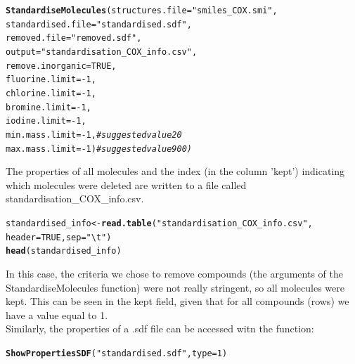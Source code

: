 \documentclass[twoside,a4wide,12pt]{article}\usepackage[]{graphicx}\usepackage[]{color}
\makeatletter
\newcommand{\hlnum}[1]{\textcolor[rgb]{0.686,0.059,0.569}{#1}}%
\newcommand{\hlstr}[1]{\textcolor[rgb]{0.192,0.494,0.8}{#1}}%
\newcommand{\hlcom}[1]{\textcolor[rgb]{0.678,0.584,0.686}{\textit{#1}}}%
\newcommand{\hlopt}[1]{\textcolor[rgb]{0,0,0}{#1}}%
\newcommand{\hlstd}[1]{\textcolor[rgb]{0.345,0.345,0.345}{#1}}%
\newcommand{\hlkwb}[1]{\textcolor[rgb]{0.69,0.353,0.396}{#1}}%
\newcommand{\hlkwc}[1]{\textcolor[rgb]{0.333,0.667,0.333}{#1}}%
\newcommand{\hlkwd}[1]{\textcolor[rgb]{0.737,0.353,0.396}{\textbf{#1}}}%
\newenvironment{kframe}{%
 \def\at@end@of@kframe{}%
 \ifinner\ifhmode%
  \def\at@end@of@kframe{\end{minipage}}%
  \begin{minipage}{\columnwidth}%
 \fi\fi%
 \def\FrameCommand##1{\hskip\@totalleftmargin \hskip-\fboxsep
 \colorbox{shadecolor}{##1}\hskip-\fboxsep
     \hskip-\linewidth \hskip-\@totalleftmargin \hskip\columnwidth}%
 \MakeFramed {\advance\hsize-\width
   \@totalleftmargin\z@ \linewidth\hsize
   \@setminipage}}%
 {\par\unskip\endMakeFramed%
 \at@end@of@kframe}
\newenvironment{knitrout}{}{} %
\makeatother
\begin{document}
\begin{knitrout}
\color{fgcolor}\begin{kframe}
\begin{alltt}
\hlkwd{StandardiseMolecules}\hlstd{(}\hlkwc{structures.file}\hlstd{=}\hlstr{"smiles_COX.smi"}\hlstd{,}
\hlkwc{standardised.file}\hlstd{=}\hlstr{"standardised.sdf"}\hlstd{,}
\hlkwc{removed.file}\hlstd{=}\hlstr{"removed.sdf"}\hlstd{,}
\hlkwc{output}\hlstd{=}\hlstr{"standardisation_COX_info.csv"}\hlstd{,}
\hlkwc{remove.inorganic}\hlstd{=}\hlnum{TRUE}\hlstd{,}
\hlkwc{fluorine.limit}\hlstd{=}\hlopt{-}\hlnum{1}\hlstd{,}
\hlkwc{chlorine.limit}\hlstd{=}\hlopt{-}\hlnum{1}\hlstd{,}
\hlkwc{bromine.limit}\hlstd{=}\hlopt{-}\hlnum{1}\hlstd{,}
\hlkwc{iodine.limit}\hlstd{=}\hlopt{-}\hlnum{1}\hlstd{,}
\hlkwc{min.mass.limit}\hlstd{=}\hlopt{-}\hlnum{1}\hlstd{,} \hlcom{#suggested value 20}
\hlkwc{max.mass.limit}\hlstd{=}\hlopt{-}\hlnum{1}\hlstd{)} \hlcom{#suggested value  900)}
\end{alltt}
\end{kframe}
\end{knitrout}

The properties of all molecules and the index (in the column 'kept') indicating which molecules were deleted are written to a file called standardisation\_COX\_info.csv.

\begin{knitrout}
\color{fgcolor}\begin{kframe}
\begin{alltt}
\hlstd{standardised_info} \hlkwb{<-} \hlkwd{read.table}\hlstd{(}\hlstr{"standardisation_COX_info.csv"}\hlstd{,}
    \hlkwc{header} \hlstd{=} \hlnum{TRUE}\hlstd{,} \hlkwc{sep} \hlstd{=} \hlstr{"\textbackslash{}t"}\hlstd{)}
\hlkwd{head}\hlstd{(standardised_info)}
\end{alltt}
\end{kframe}
\end{knitrout}


In this case, the criteria we chose to remove compounds (the arguments of the StandardiseMolecules function) were not really stringent, so all molecules were kept.
This can be seen in the kept field, given that for all compounds (rows) we have a value equal to 1.\\
Similarly, the properties of a .sdf file can be accessed witn the function:
\begin{knitrout}
\color{fgcolor}\begin{kframe}
\begin{alltt}
\hlkwd{ShowPropertiesSDF}\hlstd{(}\hlstr{"standardised.sdf"}\hlstd{,} \hlkwc{type} \hlstd{=} \hlnum{1}\hlstd{)}
\end{alltt}
\end{kframe}
\end{knitrout}
\end{document}
